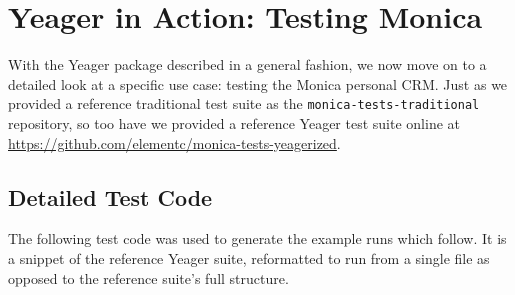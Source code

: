 \section{Yeager in Action: Testing Monica}
With the Yeager package described in a general fashion, we now move on to a detailed look at a specific use case: testing the Monica personal CRM. Just as we provided a reference traditional test suite as the \texttt{monica-tests-traditional} repository, so too have we provided a reference Yeager test suite online at \url{https://github.com/elementc/monica-tests-yeagerized}.

\subsection{Detailed Test Code}

The following test code was used to generate the example runs which follow. It is a snippet of the reference Yeager suite, reformatted to run from a single file as opposed to the reference suite's full structure.


